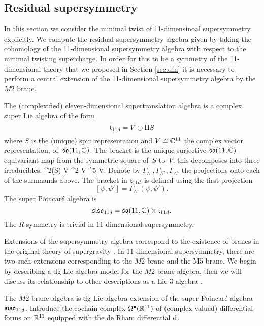 \subsection{Residual supersymmetry} 


In this section we consider the minimal twist of 11-dimensinoal supersymmetry explicitly. 
We compute the residual supersymmetry algebra given by taking the cohomology of the 11-dimensional supersymmetry algebra with respect to the minimal twisting supercharge. 
In order for this to be a symmetry of the 11-dimensional theory that we proposed in Section \ref{sec:dfn} it is necessary to perform a central extension of the 11-dimensional supersymmetry algebra by the $M2$ brane.


The (complexified) eleven-dimensional supertranslation algebra is a complex super Lie algebra of the form
\[
  \mathfrak t_{11d} = V \oplus \Pi S
\]
where $S$ is the (unique) spin representation and $V \cong \mathbb C^{11}$ the complex vector representation, of~$\mathfrak{so}(11, \mathbb C)$. 
The bracket is the unique surjective $\mathfrak{so}(11,\mathbb C)$-equivariant map from the symmetric square of~$S$ to~$V$;
this decomposes into three irreducibles, 
\beqn\label{eqn:decomp}
  \Sym^2(S) \cong V \oplus \wedge^2 V \oplus \wedge^5 V.
\eeqn
Denote by $\Gamma_{\wedge^1}, \Gamma_{\wedge^2}, \Gamma_{\wedge^5}$ the projections onto each of the summands above. 
The bracket in $\mathfrak t_{11d}$ is defined using the first projection
\[
[\psi, \psi'] = \Gamma_{\wedge^1} (\psi, \psi') .
\]
The super Poincar\'{e} algebra is
\[
  \mathfrak{siso}_{11d} = \mathfrak{so}(11 , \mathbb C) \ltimes \mathfrak t_{11d} .
\]
The $R$-symmetry is trivial in 11-dimensional supersymmetry. 



Extensions of the supersymmetry algebra correspond to the existence of branes in the original theory of supergravity . 
In 11-dimensional supersymmetry, there are two such extensions corresponding to the $M2$ brane and the M5 brane.
We begin by describing a dg Lie algebra model for the $M2$ brane algebra, then we will discuss its relationship to other descriptions as a Lie 3-algebra \cite{Basu_2005,Bagger_2007,fiorenza2015super}. 

The $M2$ brane algebra is dg Lie algebra extension of the super Poincar\'e algebra $\mathfrak{siso}_{11d}$.
Introduce the cochain complex $\Omega^{\bullet}(\mathbb R^{11})$ of (complex valued) differential forms on $\mathbb R^{11}$ equipped with the de Rham differential ${\rm d}$.  
 
